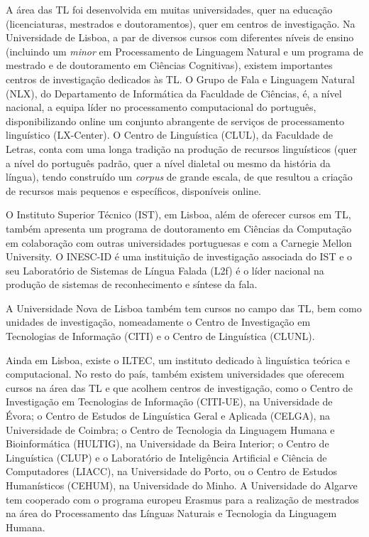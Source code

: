 \begin{multicols}{2}
A área das TL foi desenvolvida em muitas universidades, quer na educação (licenciaturas, mestrados e doutoramentos), quer em centros de investigação. Na Universidade de Lisboa, a par de diversos cursos com diferentes níveis de ensino (incluindo um \textit{minor} em Processamento de Linguagem Natural e um programa de mestrado e de doutoramento em Ciências Cognitivas), existem importantes centros de investigação dedicados às TL. O Grupo de Fala e Linguagem Natural (NLX), do Departamento de Informática da Faculdade de Ciências, é, a nível nacional, a equipa líder no processamento computacional do português, disponibilizando online um conjunto abrangente de serviços de processamento linguístico (LX-Center). O Centro de Linguística (CLUL), da Faculdade de Letras, conta com uma longa tradição na produção de recursos linguísticos (quer a nível do português padrão, quer a nível dialetal ou mesmo da história da língua), tendo construído um \textit{corpus} de grande escala, de que resultou a criação de recursos mais pequenos e específicos, disponíveis online.

O Instituto Superior Técnico (IST), em Lisboa, além de oferecer cursos em TL, também apresenta um programa de doutoramento em Ciências da Computação em colaboração com outras universidades portuguesas e com a Carnegie Mellon University. O INESC-ID é uma instituição de investigação associada do IST e o seu Laboratório de Sistemas de Língua Falada (L2f) é o líder nacional na produção de sistemas de reconhecimento e síntese da fala.

A Universidade Nova de Lisboa também tem cursos no campo das TL, bem como unidades de investigação, nomeadamente o Centro de Investigação em Tecnologias de Informação (CITI) e o Centro de Linguística (CLUNL). 

Ainda em Lisboa, existe o ILTEC, um instituto dedicado à linguística teórica e computacional. No resto do país, também existem universidades que oferecem cursos na área das TL e que acolhem centros de investigação, como o Centro de Investigação em Tecnologias de Informação (CITI-UE), na Universidade de Évora; o Centro de Estudos de Linguística Geral e Aplicada (CELGA), na Universidade de Coimbra; o Centro de Tecnologia da Linguagem Humana e Bioinformática (HULTIG), na Universidade da Beira Interior; o Centro de Linguística (CLUP) e o Laboratório de Inteligência Artificial e Ciência de Computadores (LIACC), na Universidade do Porto, ou o Centro de Estudos Humanísticos (CEHUM), na Universidade do Minho. A Universidade do Algarve tem cooperado com o programa europeu Erasmus para a realização de mestrados na área do Processamento das Línguas Naturais e Tecnologia da Linguagem Humana.


\end{multicols}
